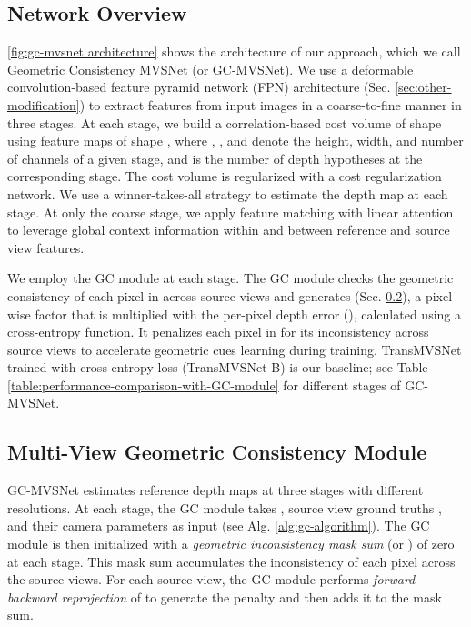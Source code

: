 \documentclass[10pt,twocolumn,letterpaper]{article}
\begin{document}
\subsection{Network Overview}\label{sec:network-overview}

\cref{fig:gc-mvsnet architecture} shows the architecture of our approach, which we call
Geometric Consistency MVSNet (or GC-MVSNet). We use a deformable convolution-based
\cite{Dai2017deformableCNN}  feature pyramid network (FPN) \cite{Lin2016featurepyramid}
architecture (Sec. \ref{sec:other-modification}) to extract features
from input images in a coarse-to-fine manner in three stages.
 At each stage, we build a correlation-based cost volume
of shape  using feature
maps of shape ,
where , , and
 denote the height, width, and number of channels of a given stage, and
 is the number of depth
hypotheses at the corresponding stage.
The cost volume is
regularized with a cost regularization network.
We use a
winner-takes-all strategy to estimate the depth
map  at each stage. At only the coarse stage, we apply feature matching
\cite{ding2022transmvsnet} with linear attention
\cite{angelos2020linearattention, ding2022transmvsnet} to leverage
global context information within and between reference and source
view features. 

We employ the GC module at each stage. The GC module
checks the geometric consistency of each pixel in  across 
source views and generates 
(Sec. \ref{sec:multi-source-GC-module}), a pixel-wise 
factor that is
multiplied with the per-pixel depth error (), calculated using a
cross-entropy function. It penalizes each pixel in  for its
inconsistency across  source views to accelerate geometric cues
learning during training. TransMVSNet \cite{ding2022transmvsnet} trained with cross-entropy loss (TransMVSNet-B) is our baseline; see Table \ref{table:performance-comparison-with-GC-module} for different stages of GC-MVSNet.

\vspace{-3pt}
\subsection{Multi-View Geometric Consistency Module}\label{sec:multi-source-GC-module}

GC-MVSNet estimates reference depth maps at three stages with
different resolutions. At each stage, the GC module takes , 
source view ground truths , and their camera
parameters  as input (see Alg. \ref{alg:gc-algorithm}). The GC module is then initialized
with a \textit{geometric inconsistency mask sum} (or ) of
zero at each stage. This mask sum accumulates the inconsistency of
each pixel across the  source views. For each source view, the GC
module performs \textit{forward-backward reprojection}  of 
to generate the penalty and then adds it to the mask sum.
\end{document}
